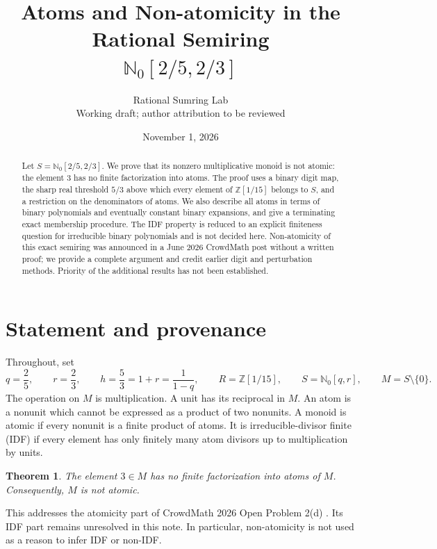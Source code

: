 \documentclass[11pt]{article}
\title{Atoms and Non-atomicity in the Rational Semiring\\
$\mathbb N_0[2/5,2/3]$}
\author{Rational Sumring Lab\\\small Working draft; author attribution to be reviewed}
\date{November 1, 2026}
\newtheorem{theorem}{Theorem}[section]
\theoremstyle{definition}
\newcommand{\NN}{\mathbb N}
\newcommand{\ZZ}{\mathbb Z}
\begin{document}
\maketitle
\begin{abstract}
Let $S=\mathbb N_0[2/5,2/3]$. We prove that its nonzero multiplicative
monoid is not atomic: the element $3$ has no finite factorization into
atoms. The proof uses a binary digit map, the sharp real threshold $5/3$
above which every element of $\mathbb Z[1/15]$ belongs to $S$, and a
restriction on the denominators of atoms. We also describe all atoms in
terms of binary polynomials and eventually constant binary expansions,
and give a terminating exact membership procedure. The IDF property is
reduced to an explicit finiteness question for irreducible binary
polynomials and is not decided here. Non-atomicity of this exact semiring
was announced in a June 2026 CrowdMath post without a written proof;
we provide a complete argument and credit earlier digit and perturbation
methods. Priority of the additional results has not been established.
\end{abstract}

\section{Statement and provenance}
Throughout, set
\[
 q=\frac25,\qquad r=\frac23,\qquad h=\frac53=1+r=\frac1{1-q},
 \qquad R=\ZZ[1/15],\qquad S=\NN_0[q,r],\qquad M=S\setminus\{0\}.
\]
The operation on $M$ is multiplication. A unit has its reciprocal in $M$.
An atom is a nonunit which cannot be expressed as a product of two
nonunits. A monoid is atomic if every nonunit is a finite product of
atoms. It is irreducible-divisor finite (IDF) if every element has only
finitely many atom divisors up to multiplication by units.

\begin{theorem}\label{thm:main}
The element $3\in M$ has no finite factorization into atoms of $M$.
Consequently, $M$ is not atomic.
\end{theorem}

This addresses the atomicity part of CrowdMath 2026 Open Problem 2(d)
\cite{cm2}. Its IDF part remains unresolved in this note. In particular,
non-atomicity is not used as a reason to infer IDF or non-IDF.
\end{document}
